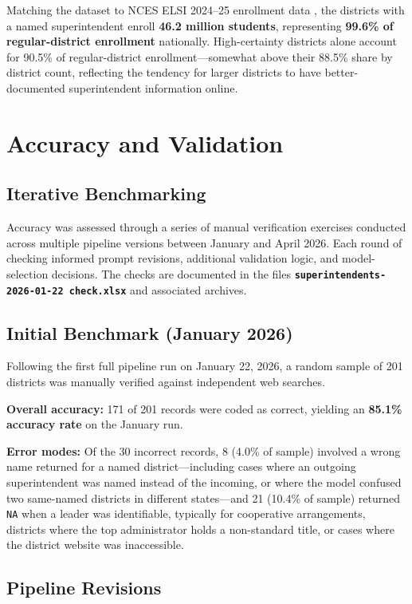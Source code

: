 \documentclass[12pt]{article}
\begin{document}
Matching the dataset to NCES ELSI 2024--25 enrollment data \citep{nces_ccd}, the districts with a named superintendent enroll \textbf{46.2 million students}, representing \textbf{99.6\% of regular-district enrollment} nationally. High-certainty districts alone account for 90.5\% of regular-district enrollment---somewhat above their 88.5\% share by district count, reflecting the tendency for larger districts to have better-documented superintendent information online.


\section{Accuracy and Validation}
\label{sec:accuracy}

\subsection{Iterative Benchmarking}

Accuracy was assessed through a series of manual verification exercises conducted across multiple pipeline versions between January and April 2026. Each round of checking informed prompt revisions, additional validation logic, and model-selection decisions. The checks are documented in the files \textbf{\texttt{superintendents-2026-01-22 check.xlsx}} and associated archives.

\subsection{Initial Benchmark (January 2026)}

Following the first full pipeline run on January 22, 2026, a random sample of 201 districts was manually verified against independent web searches.

\textbf{Overall accuracy:} 171 of 201 records were coded as correct, yielding an \textbf{85.1\% accuracy rate} on the January run.

\textbf{Error modes:} Of the 30 incorrect records, 8 (4.0\% of sample) involved a wrong name returned for a named district---including cases where an outgoing superintendent was named instead of the incoming, or where the model confused two same-named districts in different states---and 21 (10.4\% of sample) returned \texttt{NA} when a leader was identifiable, typically for cooperative arrangements, districts where the top administrator holds a non-standard title, or cases where the district website was inaccessible.

\subsection{Pipeline Revisions}
\end{document}
